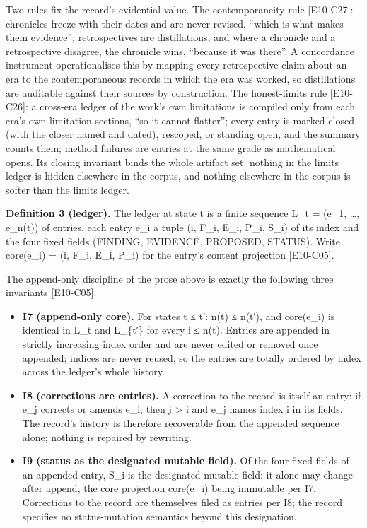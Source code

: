 \documentclass[
  11pt,
]{article}
\begin{document}
Two rules fix the record's evidential value. The contemporaneity rule
{[}E10-C27{]}: chronicles freeze with their dates and are never revised,
``which is what makes them evidence''; retrospectives are distillations,
and where a chronicle and a retrospective disagree, the chronicle wins,
``because it was there''. A concordance instrument operationalises this
by mapping every retrospective claim about an era to the contemporaneous
records in which the era was worked, so distillations are auditable
against their sources by construction. The honest-limits rule
{[}E10-C26{]}: a cross-era ledger of the work's own limitations is
compiled only from each era's own limitation sections, ``so it cannot
flatter''; every entry is marked closed (with the closer named and
dated), rescoped, or standing open, and the summary counts them; method
failures are entries at the same grade as mathematical opens. Its
closing invariant binds the whole artifact set: nothing in the limits
ledger is hidden elsewhere in the corpus, and nothing elsewhere in the
corpus is softer than the limits ledger.

\textbf{Definition 3 (ledger).} The ledger at state t is a finite
sequence L\_t = (e\_1, \ldots, e\_n(t)) of entries, each entry e\_i a
tuple (i, F\_i, E\_i, P\_i, S\_i) of its index and the four fixed fields
(FINDING, EVIDENCE, PROPOSED, STATUS). Write core(e\_i) = (i, F\_i,
E\_i, P\_i) for the entry's content projection {[}E10-C05{]}.

The append-only discipline of the prose above is exactly the following
three invariants {[}E10-C05{]}.

\begin{itemize}
\item
  \textbf{I7 (append-only core).} For states t ≤ t′: n(t) ≤ n(t′), and
  core(e\_i) is identical in L\_t and L\_\{t′\} for every i ≤ n(t).
  Entries are appended in strictly increasing index order and are never
  edited or removed once appended; indices are never reused, so the
  entries are totally ordered by index across the ledger's whole
  history.
\item
  \textbf{I8 (corrections are entries).} A correction to the record is
  itself an entry: if e\_j corrects or amends e\_i, then j
  \textgreater{} i and e\_j names index i in its fields. The record's
  history is therefore recoverable from the appended sequence alone;
  nothing is repaired by rewriting.
\item
  \textbf{I9 (status as the designated mutable field).} Of the four
  fixed fields of an appended entry, S\_i is the designated mutable
  field: it alone may change after append, the core projection
  core(e\_i) being immutable per I7. Corrections to the record are
  themselves filed as entries per I8; the record specifies no
  status-mutation semantics beyond this designation.
\end{itemize}
\end{document}
